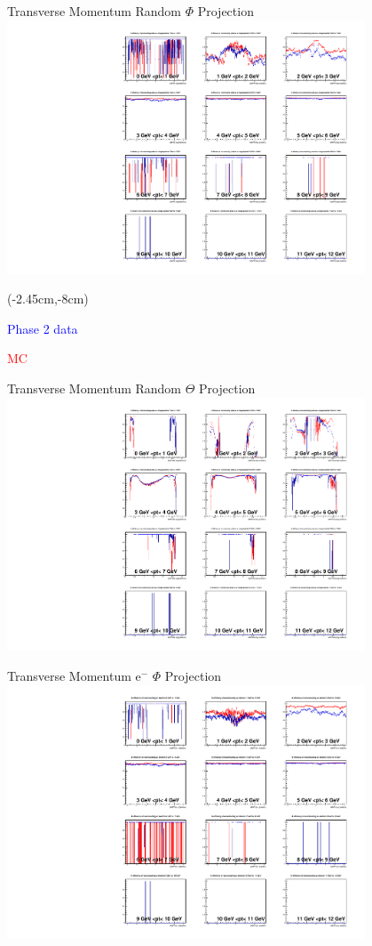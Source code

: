 \documentclass[10pt]{beamer}
\begin{document}
\begin{frame}{Transverse Momentum Random $\Phi$ Projection}
	\centering
	\includegraphics[width=0.8\textwidth]{Momentum/PtMPhiRandom.pdf}
	\begin{textblock*}{0.5\textwidth}(-2.45cm,-8cm)
		\small{
			\textcolor{blue}{Phase 2 data}
			
			\textcolor{red}{MC}
		}
\end{textblock*}	
	
	
\end{frame}


\begin{frame}{Transverse Momentum Random $\Theta$ Projection}
	\centering
	\includegraphics[width=0.8\textwidth]{Momentum/PtMThetaRandom.pdf}
\end{frame}




\begin{frame}{Transverse Momentum $\textrm{e}^-$ $\Phi$ Projection}
	\centering
	\includegraphics[width=0.8\textwidth]{Momentum/PtMPhiem.pdf}
\end{frame}
\end{document}
